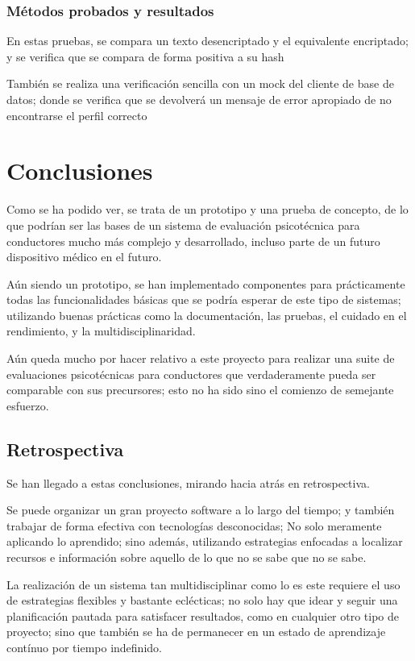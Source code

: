 \documentclass[12pt,a4paper,twoside,openright]{book}
\begin{document}
\subsection{Métodos probados y resultados}

En estas pruebas, se compara un texto desencriptado y el equivalente encriptado; y se verifica que se compara de forma positiva a su hash

También se realiza una verificación sencilla con un mock del cliente de base de datos; donde se verifica que se devolverá un mensaje de error apropiado de no encontrarse el perfil correcto

\chapter{Conclusiones}

Como se ha podido ver, se trata de un prototipo y una prueba de concepto, de lo que podrían ser las bases de un sistema de evaluación psicotécnica para conductores mucho más complejo y desarrollado, incluso parte de un futuro dispositivo médico en el futuro.

Aún siendo un prototipo, se han implementado componentes para prácticamente todas las funcionalidades básicas que se podría esperar de este tipo de sistemas; utilizando buenas prácticas como la documentación, las pruebas, el cuidado en el rendimiento, y la multidisciplinaridad.

Aún queda mucho por hacer relativo a este proyecto para realizar una suite de evaluaciones psicotécnicas para conductores que verdaderamente pueda ser comparable con sus precursores; esto no ha sido sino el comienzo de semejante esfuerzo.

\section{Retrospectiva}

Se han llegado a estas conclusiones, mirando hacia atrás en retrospectiva.

Se puede organizar un gran proyecto software a lo largo del tiempo; y también trabajar de forma efectiva con tecnologías desconocidas; No solo meramente aplicando lo aprendido; sino además, utilizando estrategias enfocadas a localizar recursos e información sobre aquello de lo que no se sabe que no se sabe.

La realización de un sistema tan multidisciplinar como lo es este requiere el uso de estrategias flexibles y bastante eclécticas; no solo hay que idear y seguir una planificación pautada para satisfacer resultados, como en cualquier otro tipo de proyecto; sino que también se ha de permanecer en un estado de aprendizaje contínuo por tiempo indefinido.
\end{document}

